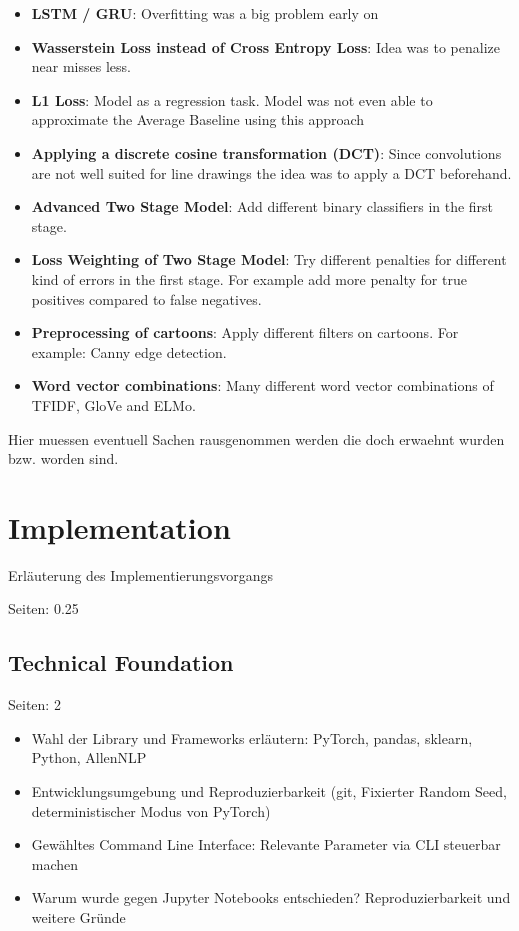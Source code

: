 \documentclass[draft,final,oneside]{vutinfth} %
\begin{document}
\begin{itemize}
\item \textbf{LSTM / GRU}: Overfitting was a big problem early on
\item \textbf{Wasserstein Loss instead of Cross Entropy Loss}: Idea was to penalize near misses less.
\item \textbf{L1 Loss}: Model as a regression task. Model was not even able to approximate the Average Baseline using this approach
\item \textbf{Applying a discrete cosine transformation (DCT)}: Since convolutions are not well suited for line drawings the idea was to apply a DCT beforehand. 
\item \textbf{Advanced Two Stage Model}: Add different binary classifiers in the first stage.
\item \textbf{Loss Weighting of Two Stage Model}: Try different penalties for different kind of errors in the first stage. For example add more penalty for true positives compared to false negatives.
\item \textbf{Preprocessing of cartoons}: Apply different filters on cartoons. For example: Canny edge detection.
\item \textbf{Word vector combinations}: Many different word vector combinations of TFIDF, GloVe and ELMo. 
\end{itemize}

Hier muessen eventuell Sachen rausgenommen werden die doch erwaehnt wurden bzw. worden sind.
\fi

\chapter{Implementation} \label{implementationchapter}

Erläuterung des Implementierungsvorgangs

Seiten: 0.25

\section{Technical Foundation}

Seiten: 2

\begin{itemize}

\item Wahl der Library und Frameworks erläutern: PyTorch, pandas, sklearn, Python, AllenNLP
\item Entwicklungsumgebung und Reproduzierbarkeit (git, Fixierter Random Seed, deterministischer Modus von PyTorch)
\item Gewähltes Command Line Interface: Relevante Parameter via CLI steuerbar machen
\item Warum wurde gegen Jupyter Notebooks entschieden? Reproduzierbarkeit und weitere Gründe

\end{itemize}
\end{document}
